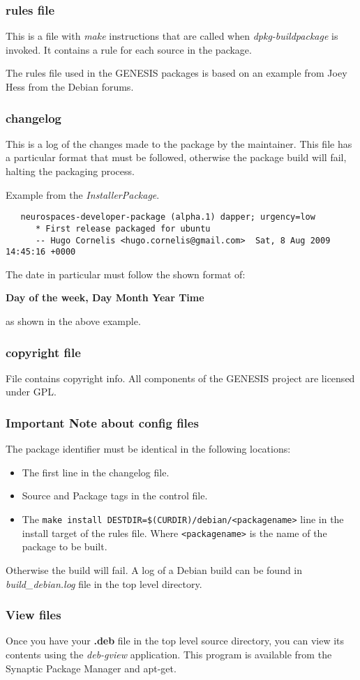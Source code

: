 \documentclass[12pt]{article}
\begin{document}
\subsubsection*{rules file}

This is a file with {\it make} instructions that are called when {\it dpkg-buildpackage} is invoked. It contains a rule for each source in the package.

The rules file used in the GENESIS packages is based on an example from Joey Hess from the Debian forums.

\subsubsection*{changelog}

This is a log of the changes made to the package by the maintainer. This file has a particular format that must be followed, otherwise the package build will fail, halting the packaging process.

Example from the {\it InstallerPackage}.
\begin{verbatim}
   neurospaces-developer-package (alpha.1) dapper; urgency=low
      * First release packaged for ubuntu
      -- Hugo Cornelis <hugo.cornelis@gmail.com>  Sat, 8 Aug 2009 14:45:16 +0000
\end{verbatim}

The date in particular must follow the shown format of:

    {\bf Day of the week, Day Month Year Time} 

as shown in the above example.

\subsubsection*{copyright file}

File contains copyright info. All components of the GENESIS project are licensed under GPL.

\subsubsection*{Important Note about config files}

The package identifier must be identical in the following locations:
\begin{itemize}
   \item The first line in the changelog file.
   \item Source and Package tags in the control file.
   \item The {\tt make install DESTDIR=\$(CURDIR)/debian/<packagename>} line in the install target of the rules file. Where {\tt <packagename>} is the name of the package to be built. 
\end{itemize}
Otherwise the build will fail. A log of a Debian build can be found in {\it build\_debian.log} file in the top level directory.

\subsubsection*{View files}

Once you have your {\bf .deb} file in the top level source directory, you can view its contents using the {\it deb-gview} application. This program is available from the Synaptic Package Manager and apt-get.
\end{document}
